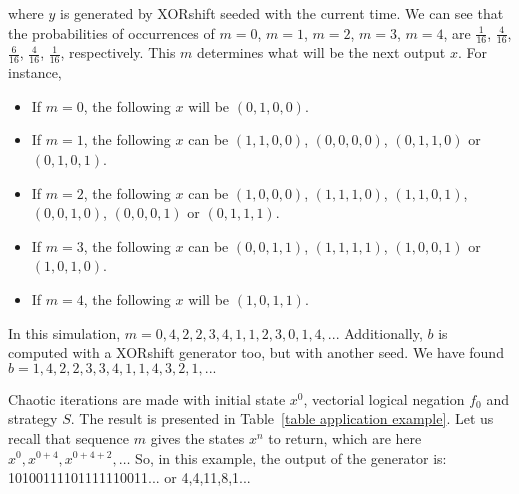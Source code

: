 \documentclass[10pt, a4paper, conference, compsocconf]{IEEEtran}
\begin{document}
\noindent where $y$ is generated by XORshift seeded with the current time. We can see that the probabilities of occurrences of $m=0$, $m=1$, $m=2$, $m=3$, $m=4$, are $\frac{1}{16}$, $\frac{4}{16}$, $\frac{6}{16}$, $\frac{4}{16}$, $\frac{1}{16}$, respectively. This $m$ determines what will be the next output $x$. For instance, 
\begin{itemize}
\item If $m=0$, the following $x$ will be $( 0, 1, 0, 0)$.
\item If $m=1$, the following $x$ can be $( 1, 1, 0, 0)$, $( 0, 0, 0, 0)$, $( 0, 1, 1, 0)$ or $( 0, 1, 0, 1)$.
\item If $m=2$, the following $x$ can be $( 1, 0, 0, 0)$, $( 1, 1, 1, 0)$, $( 1, 1, 0, 1)$, $( 0, 0, 1, 0)$, $( 0, 0, 0, 1)$ or $( 0, 1, 1, 1)$.
\item If $m=3$, the following $x$ can be $( 0, 0, 1, 1)$, $( 1, 1, 1, 1)$, $( 1, 0, 0, 1)$ or $( 1, 0, 1, 0)$.
\item If $m=4$, the following $x$ will be $( 1, 0, 1, 1)$.
\end{itemize}

In this simulation, $m = 0, 4, 2, 2, 3, 4, 1, 1, 2, 3, 0, 1, 4,...$ Additionally, $b$ is computed with a XORshift generator too, but with another seed. We have found $b = 1, 4, 2, 2, 3, 3, 4, 1, 1, 4, 3, 2, 1,...$

Chaotic iterations are made with initial state $x^0$, vectorial logical negation $f_0$ and 
strategy $S$. The result is presented in Table~\ref{table application example}. Let us recall that sequence $m$ gives the states $x^n$ to return, which are here $x^0, x^{0+4}, x^{0+4+2}, \hdots$ So, in this example, the output of the generator is: 10100111101111110011... or 4,4,11,8,1... 
\end{document}
